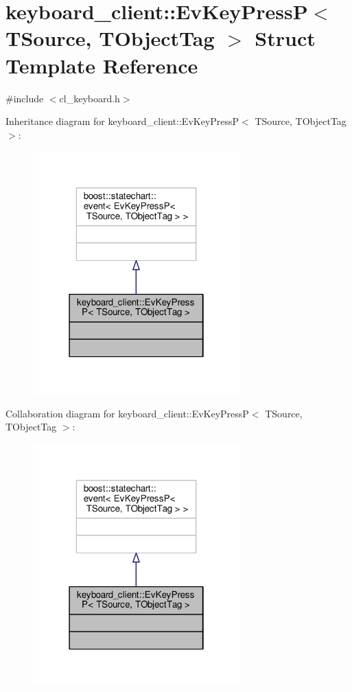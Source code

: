 \hypertarget{structkeyboard__client_1_1EvKeyPressP}{}\section{keyboard\+\_\+client\+:\+:Ev\+Key\+PressP$<$ T\+Source, T\+Object\+Tag $>$ Struct Template Reference}
\label{structkeyboard__client_1_1EvKeyPressP}


{\ttfamily \#include $<$cl\+\_\+keyboard.\+h$>$}



Inheritance diagram for keyboard\+\_\+client\+:\+:Ev\+Key\+PressP$<$ T\+Source, T\+Object\+Tag $>$\+:\nopagebreak
\begin{figure}[H]
\begin{center}
\leavevmode
\includegraphics[width=226pt]{structkeyboard__client_1_1EvKeyPressP__inherit__graph}
\end{center}
\end{figure}


Collaboration diagram for keyboard\+\_\+client\+:\+:Ev\+Key\+PressP$<$ T\+Source, T\+Object\+Tag $>$\+:\nopagebreak
\begin{figure}[H]
\begin{center}
\leavevmode
\includegraphics[width=226pt]{structkeyboard__client_1_1EvKeyPressP__coll__graph}
\end{center}
\end{figure}


